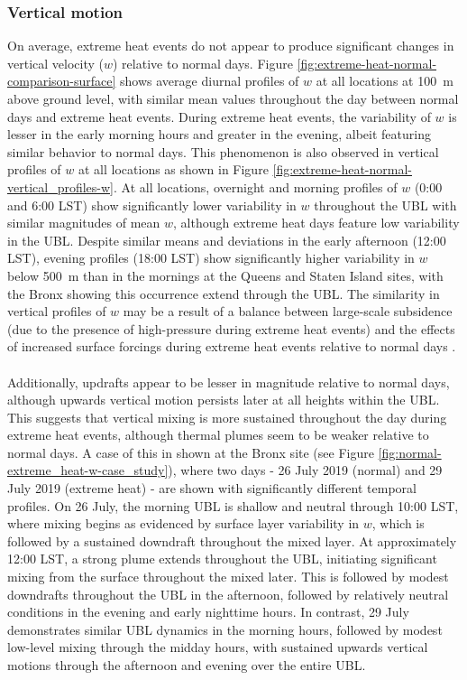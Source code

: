 \FloatBarrier

\subsubsection{Vertical motion}
On average, extreme heat events do not appear to produce significant changes in vertical velocity ($w$) relative to normal days. Figure \ref{fig:extreme-heat-normal-comparison-surface} shows average diurnal profiles of $w$ at all locations at \SI{100}{\meter} above ground level, with similar mean values throughout the day between normal days and extreme heat events. During extreme heat events, the variability of $w$ is lesser in the early morning hours and greater in the evening, albeit featuring similar behavior to normal days. This phenomenon is also observed in vertical profiles of $w$ at all locations as shown in Figure \ref{fig:extreme-heat-normal-vertical_profiles-w}. At all locations, overnight and morning profiles of $w$ (0:00 and 6:00 LST) show significantly lower variability in $w$ throughout the UBL with similar magnitudes of mean $w$, although extreme heat days feature low variability in the UBL. Despite similar means and deviations in the early afternoon (12:00 LST), evening profiles (18:00 LST) show significantly higher variability in $w$ below \SI{500}{\meter} than in the mornings at the Queens and Staten Island sites, with the Bronx showing this occurrence extend through the UBL. The similarity in vertical profiles of $w$ may be a result of a balance between large-scale subsidence (due to the presence of high-pressure during extreme heat events) and the effects of increased surface forcings during extreme heat events relative to normal days \citep{dong2018, zhang2009}.
\\ \\
Additionally, updrafts appear to be lesser in magnitude relative to normal days, although upwards vertical motion persists later at all heights within the UBL. This suggests that vertical mixing is more sustained throughout the day during extreme heat events, although thermal plumes seem to be weaker relative to normal days. A case of this in shown at the Bronx site (see Figure \ref{fig:normal-extreme_heat-w-case_study}), where two days - 26 July 2019 (normal) and 29 July 2019 (extreme heat) - are shown with significantly different temporal profiles. On 26 July, the morning UBL is shallow and neutral through 10:00 LST, where mixing begins as evidenced by surface layer variability in $w$, which is followed by a sustained downdraft throughout the mixed layer. At approximately 12:00 LST, a strong plume extends throughout the UBL, initiating significant mixing from the surface throughout the mixed later. This is followed by modest downdrafts throughout the UBL in the afternoon, followed by relatively neutral conditions in the evening and early nighttime hours. In contrast, 29 July demonstrates similar UBL dynamics in the morning hours, followed by modest low-level mixing through the midday hours, with sustained upwards vertical motions through the afternoon and evening over the entire UBL. 

